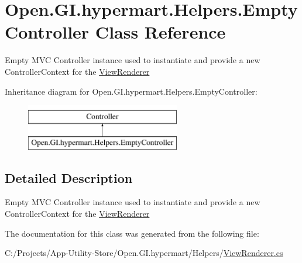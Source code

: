 \hypertarget{class_open_1_1_g_i_1_1hypermart_1_1_helpers_1_1_empty_controller}{}\section{Open.\+G\+I.\+hypermart.\+Helpers.\+Empty\+Controller Class Reference}
\label{class_open_1_1_g_i_1_1hypermart_1_1_helpers_1_1_empty_controller}


Empty M\+VC Controller instance used to instantiate and provide a new Controller\+Context for the \hyperlink{class_open_1_1_g_i_1_1hypermart_1_1_helpers_1_1_view_renderer}{View\+Renderer}  


Inheritance diagram for Open.\+G\+I.\+hypermart.\+Helpers.\+Empty\+Controller\+:\begin{figure}[H]
\begin{center}
\leavevmode
\includegraphics[height=2.000000cm]{class_open_1_1_g_i_1_1hypermart_1_1_helpers_1_1_empty_controller}
\end{center}
\end{figure}


\subsection{Detailed Description}
Empty M\+VC Controller instance used to instantiate and provide a new Controller\+Context for the \hyperlink{class_open_1_1_g_i_1_1hypermart_1_1_helpers_1_1_view_renderer}{View\+Renderer} 



The documentation for this class was generated from the following file\+:\begin{DoxyCompactItemize}
\item 
C\+:/\+Projects/\+App-\/\+Utility-\/\+Store/\+Open.\+G\+I.\+hypermart/\+Helpers/\hyperlink{_view_renderer_8cs}{View\+Renderer.\+cs}\end{DoxyCompactItemize}
